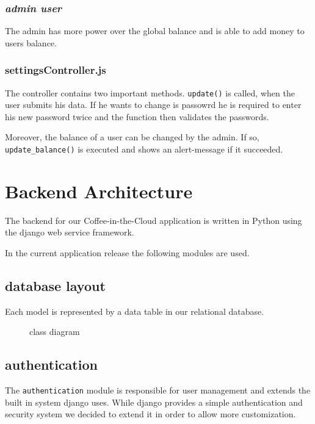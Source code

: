 \subsubsection*{\emph{admin user}}

The admin has more power over the global balance and is able to add
money to users balance.

\subsubsection*{settingsController.js}

The controller contains two important methods. \texttt{update()} is
called, when the user submits his data. If he wants to change is
passowrd he is required to enter his new password twice and the function
then validates the passwords.

Moreover, the balance of a user can be changed by the admin. If so,
\texttt{update\_balance()} is executed and shows an alert-message if it
succeeded.

\newpage
\section{Backend Architecture}\label{backend-architecture}

The backend for our Coffee-in-the-Cloud application is written in Python
using the django web service framework.

In the current application release the following modules are used.

\subsection{database layout}\label{database-layout}

Each model is represented by a data table in our relational database.

\begin{figure}[htbp]
\centering
{}
\caption{class diagram}
\end{figure}

\subsection{authentication}\label{authentication}

The \texttt{authentication} module is responsible for user management
and extends the built in system django uses. While django provides a
simple authentication and security system we decided to extend it in
order to allow more customization.

